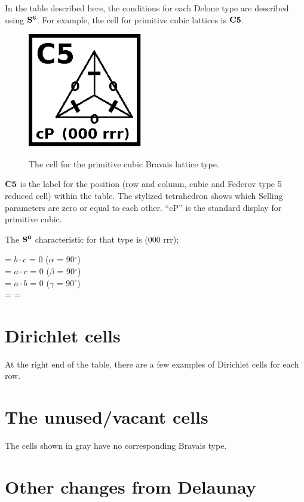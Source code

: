 \documentclass[preprint]{iucr}              %
\numberwithin{equation}{section}
\newcommand{\SVI}[0]{$\bf{S^{6}}$}
\begin{document}
		In the table described here, the conditions for each Delone
	type are described using \SVI{}. For example, the cell for
	primitive cubic lattices is $\bf{C5}$.
	
	
	\begin{figure}
		\includegraphics[width=5cm]{C5}
		\label{C5}
		\caption{The cell for the primitive cubic Bravais lattice type.}
	\end{figure}
	
	 $\bf{C5}$ is the label for the position (row and column, cubic and Federov type 5 reduced cell) within
	 the table. The stylized tetrahedron shows which Selling
	 parameters are zero or equal to each other. ``cP'' is the
	 standard display for primitive cubic.
	
	The \SVI{} characteristic for that type is (000 rrr); 
	
	\noindent
	\si{} = $b \cdot c$ = 0 ($\alpha$ = 90$^{\circ}$)\\
	\sii{} = $a \cdot c$ = 0 ($\beta$ = 90$^{\circ}$)\\
	\siii{} = $a \cdot b$ = 0 ($\gamma$ = 90$^{\circ}$)\\
	\siv{} = \sv{} = \svi{}	
	
\section{Dirichlet cells}

	At the right end of the table, there are a few examples of Dirichlet
	cells for each row. 
	
	
\section{The unused/vacant cells}

	The cells shown in gray have no corresponding Bravais type.
	
	
\section{Other changes from Delaunay}
\end{document}
